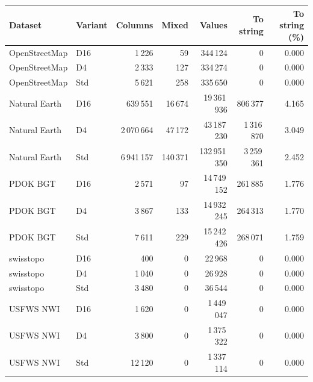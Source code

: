 \begingroup\small\setlength{\tabcolsep}{3pt}
\begin{longtable}{llrrrrr}
\toprule
Dataset & Variant & Columns & Mixed & Values & To string & To string (\%) \\
\midrule
OpenStreetMap & D16 & 1\,226 & 59 & 344\,124 & 0 & 0.000 \\
OpenStreetMap & D4 & 2\,333 & 127 & 334\,274 & 0 & 0.000 \\
OpenStreetMap & Std & 5\,621 & 258 & 335\,650 & 0 & 0.000 \\
Natural Earth & D16 & 639\,551 & 16\,674 & 19\,361\,936 & 806\,377 & 4.165 \\
Natural Earth & D4 & 2\,070\,664 & 47\,172 & 43\,187\,230 & 1\,316\,870 & 3.049 \\
Natural Earth & Std & 6\,941\,157 & 140\,371 & 132\,951\,350 & 3\,259\,361 & 2.452 \\
PDOK BGT & D16 & 2\,571 & 97 & 14\,749\,152 & 261\,885 & 1.776 \\
PDOK BGT & D4 & 3\,867 & 133 & 14\,932\,245 & 264\,313 & 1.770 \\
PDOK BGT & Std & 7\,611 & 229 & 15\,242\,426 & 268\,071 & 1.759 \\
swisstopo & D16 & 400 & 0 & 22\,968 & 0 & 0.000 \\
swisstopo & D4 & 1\,040 & 0 & 26\,928 & 0 & 0.000 \\
swisstopo & Std & 3\,480 & 0 & 36\,544 & 0 & 0.000 \\
USFWS NWI & D16 & 1\,620 & 0 & 1\,449\,047 & 0 & 0.000 \\
USFWS NWI & D4 & 3\,800 & 0 & 1\,375\,322 & 0 & 0.000 \\
USFWS NWI & Std & 12\,120 & 0 & 1\,337\,114 & 0 & 0.000 \\
\bottomrule
\end{longtable}
\endgroup
